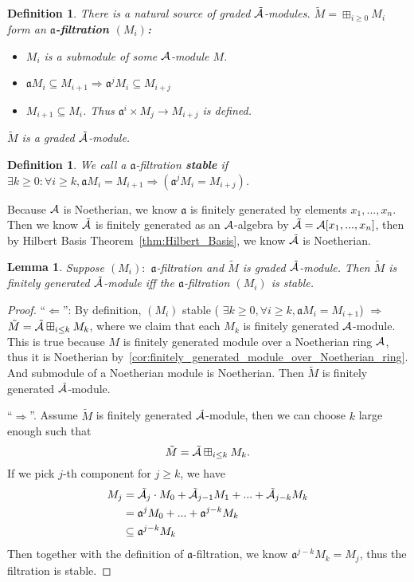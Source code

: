 \documentclass[11pt]{article}
\newtheorem{lemma}[thm]{Lemma}
\newtheorem{dfn}[thm]{Definition}
\newcommand{\sca}{{\mathfrak a}}
\newcommand{\cala}{{\cal A}}
\newcommand{\Lrta}{\Longrightarrow}
\newcommand{\lrta}{\longrightarrow}
\newcommand{\Llta}{\Longleftarrow}
\begin{document}
\begin{dfn}
There is a natural source of graded $\tilde{\cala}$-modules. $\tilde{M}=\boxplus_{i\geq 0} M_i$ form an  \textbf{$\sca$-filtration $(M_i)$:}
\begin{itemize}
\item $M_i$ is a submodule of some  $\cala$-module $M$.
\item $\sca M_i\subseteq M_{i+1}\Lrta\sca^j M_i\subseteq M_{i+j}$
\item $M_{i+1}\subseteq M_i$. Thus $\sca^i\times M_j\lrta M_{i+j}$ is defined. 
\end{itemize}
$\tilde{M}$ is a graded $\tilde{\cala}$-module.
\end{dfn}
\begin{dfn}
We call a $\sca$-filtration \textbf{stable} if $\exists k\geq 0:\forall i\geq k,\sca M_i=M_{i+1}\Lrta(\sca^j M_i=M_{i+j})$.
\end{dfn}
Because $\cala$ is Noetherian, we know $\sca$ is finitely generated by elements $x_1,...,x_n$. Then we know $\tilde{\cala}$ is finitely generated as an $\cala$-algebra by $\tilde{\cala}=\cala[x_1,...,x_n]$, then by Hilbert Basis Theorem~\ref{thm:Hilbert_Basis}, we know $\tilde{\cala}$ is Noetherian.
\begin{lemma}\label{lem:stable_filtration}
Suppose $(M_i):$ $\sca$-filtration and $\tilde{M}$ is graded $\tilde{\cala}$-module. Then $\tilde{M}$ is finitely generated $\tilde{\cala}$-module iff the $\sca$-filtration $(M_i)$ is stable.
\end{lemma}
\begin{proof}
``$\Llta$'': By definition, $(M_i)$ stable ( $\exists k\geq 0, \forall i\geq k,\sca M_i=M_{i+1}$) $\Lrta$ $\tilde{M}=\tilde{\cala}\boxplus_{i\leq k}M_k$, where we claim that each $M_k$ is finitely generated $\cala$-module. This is true because $M$ is finitely generated module over a Noetherian ring $\cala$, thus it is Noetherian by~\ref{cor:finitely_generated_module_over_Noetherian_ring}. And submodule of a Noetherian module is Noetherian. Then $\tilde{M}$ is finitely generated $\tilde{\cala}$-module.

``$\Lrta$''. Assume $\tilde{M}$ is finitely generated $\tilde{\cala}$-module, then we can choose $k$ large enough such that 
$$
\tilde{M}=\tilde{\cala}\boxplus_{i\leq k} M_k.
$$
If we pick $j$-th component for $j\geq k$, we have 
$$
\begin{aligned}
M_j&=\tilde{\cala}_j\cdot M_0+\tilde{\cala}_{j-1}M_1+...+\tilde{\cala}_{j-k}M_k\\
& = \sca^j M_0+...+\sca^{j-k}M_k\\
&\subseteq \sca^{j-k}M_k
\end{aligned}
$$
Then together with the definition of $\sca$-filtration, we know $\sca^{j-k}M_k=M_j$, thus the filtration is stable.
\end{proof}
\end{document}
